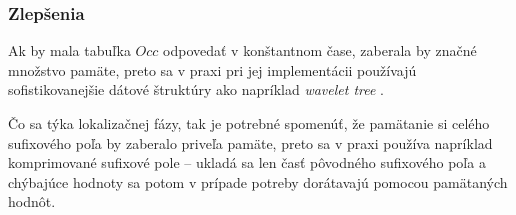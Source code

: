     \subsubsection{Zlepšenia}
    Ak by mala tabuľka $Occ$ odpovedať v konštantnom čase, zaberala by značné množstvo pamäte, preto sa v praxi pri jej implementácii používajú sofistikovanejšie dátové štruktúry ako napríklad \emph{wavelet tree} \cite{GGV03}.
    
    Čo sa týka lokalizačnej fázy, tak je potrebné spomenúť, že pamätanie si celého sufixového poľa by zaberalo priveľa pamäte, preto sa v praxi používa napríklad komprimované sufixové pole -- ukladá sa len časť pôvodného sufixového poľa a chýbajúce hodnoty sa potom v prípade potreby dorátavajú pomocou pamätaných hodnôt.
    
   